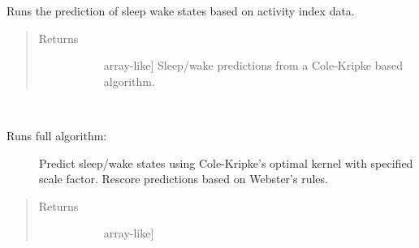\documentclass[letterpaper,10pt,english]{sphinxmanual}
\begin{document}
\begin{fulllineitems}
\begin{fulllineitems}
\label{\detokenize{index:sleeppy.colekripke.ColeKripke.apply_kernel}}
Runs the prediction of sleep wake states based on activity index data.
\begin{quote}\begin{description}
\item[{Returns}] \leavevmode\begin{description}
\item[{}] \leavevmode{[}array-like{]}
Sleep/wake predictions from a Cole-Kripke based algorithm.

\end{description}

\end{description}\end{quote}

\end{fulllineitems}


\begin{fulllineitems}
\label{\detokenize{index:sleeppy.colekripke.ColeKripke.predict}}~\begin{description}
\item[{Runs full algorithm:}] \leavevmode
Predict sleep/wake states using Cole-Kripke’s optimal kernel with specified scale factor.
Rescore predictions based on Webster’s rules.

\end{description}
\begin{quote}\begin{description}
\item[{Returns}] \leavevmode\begin{description}
\item[{}] \leavevmode{[}array-like{]}
\end{description}

\end{description}\end{quote}

\end{fulllineitems}



\end{fulllineitems}
\end{document}
